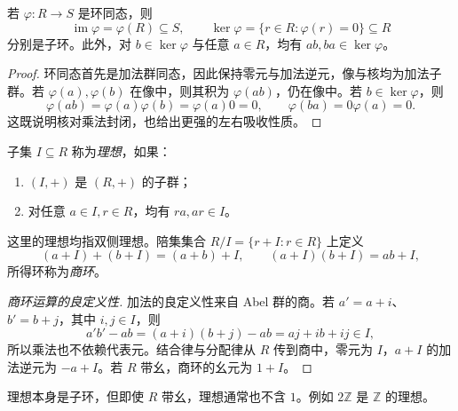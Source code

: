 \documentclass[lang=cn,a4paper,fontset=none,zihao=false,10pt,openany,twoside]{beautybook}
\numberwithin{algorithm}{chapter}
\begin{document}
\begin{proposition}[同态的像与核]
若 $\varphi:R\to S$ 是环同态，则
\[
 \operatorname{im}\varphi=\varphi(R)\subseteq S,\qquad
 \ker\varphi=\{r\in R:\varphi(r)=0\}\subseteq R
\]
分别是子环。此外，对 $b\in\ker\varphi$ 与任意 $a\in R$，均有 $ab,ba\in\ker\varphi$。
\end{proposition}
\begin{proof}
环同态首先是加法群同态，因此保持零元与加法逆元，像与核均为加法子群。若 $\varphi(a),\varphi(b)$ 在像中，则其积为 $\varphi(ab)$，仍在像中。若 $b\in\ker\varphi$，则
\[
 \varphi(ab)=\varphi(a)\varphi(b)=\varphi(a)0=0,
 \qquad \varphi(ba)=0\varphi(a)=0.
\]
这既说明核对乘法封闭，也给出更强的左右吸收性质。
\end{proof}

\begin{definition}[理想与商环]
子集 $I\subseteq R$ 称为\emph{理想}，如果：
\begin{enumerate}[(1)]
\item $(I,+)$ 是 $(R,+)$ 的子群；
\item 对任意 $a\in I,r\in R$，均有 $ra,ar\in I$。
\end{enumerate}
这里的理想均指双侧理想。陪集集合 $R/I=\{r+I:r\in R\}$ 上定义
\[
 (a+I)+(b+I)=(a+b)+I,\qquad
 (a+I)(b+I)=ab+I,
\]
所得环称为\emph{商环}。
\end{definition}
\begin{proof}[商环运算的良定义性]
加法的良定义性来自 Abel 群的商。若 $a'=a+i$、$b'=b+j$，其中 $i,j\in I$，则
\[
 a'b'-ab=(a+i)(b+j)-ab=aj+ib+ij\in I,
\]
所以乘法也不依赖代表元。结合律与分配律从 $R$ 传到商中，零元为 $I$，$a+I$ 的加法逆元为 $-a+I$。若 $R$ 带幺，商环的幺元为 $1+I$。
\end{proof}
理想本身是子环，但即使 $R$ 带幺，理想通常也不含 $1$。例如 $2\mathbb Z$ 是 $\mathbb Z$ 的理想。
\end{document}

